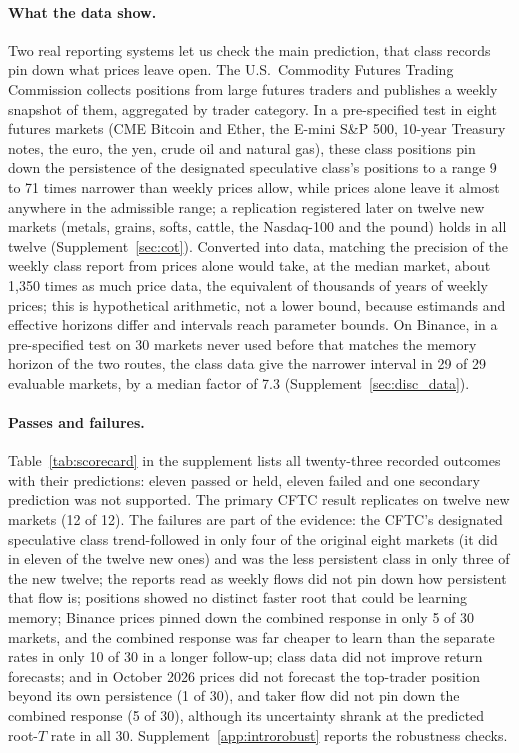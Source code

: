 \documentclass[12pt]{article}
\theoremstyle{definition}
\theoremstyle{remark}
\begin{document}
\paragraph{What the data show.} Two real reporting systems let us check the main prediction, that class records pin down what prices leave open. The U.S.\ Commodity Futures Trading Commission collects positions from large futures traders and publishes a weekly snapshot of them, aggregated by trader category. In a pre-specified test in eight futures markets (CME Bitcoin and Ether, the E-mini S\&P 500, 10-year Treasury notes, the euro, the yen, crude oil and natural gas), these class positions pin down the persistence of the designated speculative class's positions to a range 9 to 71 times narrower than weekly prices allow, while prices alone leave it almost anywhere in the admissible range; a replication registered later on twelve new markets (metals, grains, softs, cattle, the Nasdaq-100 and the pound) holds in all twelve (Supplement~\ref{sec:cot}). Converted into data, matching the precision of the weekly class report from prices alone would take, at the median market, about 1{,}350 times as much price data, the equivalent of thousands of years of weekly prices; this is hypothetical arithmetic, not a lower bound, because estimands and effective horizons differ and intervals reach parameter bounds. On Binance, in a pre-specified test on 30 markets never used before that matches the memory horizon of the two routes, the class data give the narrower interval in 29 of 29 evaluable markets, by a median factor of 7.3 (Supplement~\ref{sec:disc_data}).

\paragraph{Passes and failures.} Table~\ref{tab:scorecard} in the supplement lists all twenty-three recorded outcomes with their predictions: eleven passed or held, eleven failed and one secondary prediction was not supported. The primary CFTC result replicates on twelve new markets (12 of 12). The failures are part of the evidence: the CFTC's designated speculative class trend-followed in only four of the original eight markets (it did in eleven of the twelve new ones) and was the less persistent class in only three of the new twelve; the reports read as weekly flows did not pin down how persistent that flow is; positions showed no distinct faster root that could be learning memory; Binance prices pinned down the combined response in only 5 of 30 markets, and the combined response was far cheaper to learn than the separate rates in only 10 of 30 in a longer follow-up; class data did not improve return forecasts; and in October 2026 prices did not forecast the top-trader position beyond its own persistence (1 of 30), and taker flow did not pin down the combined response (5 of 30), although its uncertainty shrank at the predicted root-$T$ rate in all 30. Supplement~\ref{app:introrobust} reports the robustness checks.
\end{document}
